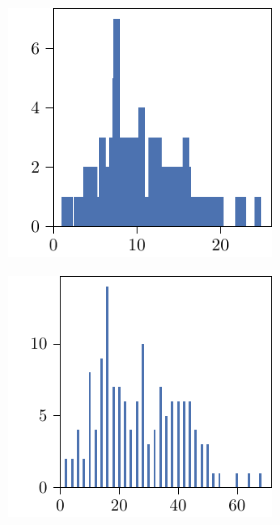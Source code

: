 \begin{figure}[p]
\begin{subfigure}{\textwidth}
\begin{subfigure}{\mymultiouter}
    \end{subfigure}
    \begin{subfigure}{\mymultiouter}
        \centering
          \includegraphics[width=\mymultiinner]{figures/new/eucledian-rain_sydney-permutation-retraining}
      \end{subfigure}
  \end{subfigure}
  \centering
  \begin{subfigure}{\textwidth}
    \centering
    \begin{subfigure}{\mymultiouter}
        \centering
          \includegraphics[width=\mymultiinner]{figures/new/manhattan-rain_sydney-qlibra-permutation}
    \end{subfigure}
    \begin{subfigure}{\mymultiouter}
        \centering

\end{subfigure}
\end{subfigure}
\end{figure}
